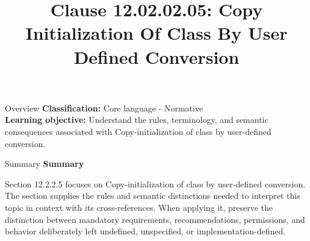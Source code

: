 \documentclass[10pt,letterpaper]{article}
\title{Clause 12.02.02.05: Copy Initialization Of Class By User Defined Conversion}
\author{}
\date{}
\begin{document}
\maketitle
\begin{CornellOverviewBox}{Overview}
\textbf{Classification:} Core language - Normative\\[2pt]
\textbf{Learning objective:} Understand the rules, terminology, and semantic consequences associated with Copy-initialization of class by user-defined conversion.
\end{CornellOverviewBox}\begin{CornellSummaryBox}{Summary}
{\sffamily\bfseries\color{Accent} Summary}\par\vspace{3pt}Section 12.2.2.5 focuses on Copy-initialization of class by user-defined conversion. The section supplies the rules and semantic distinctions needed to interpret this topic in context with its cross-references. When applying it, preserve the distinction between mandatory requirements, recommendations, permissions, and behavior deliberately left undefined, unspecified, or implementation-defined.
\end{CornellSummaryBox}
\end{document}
